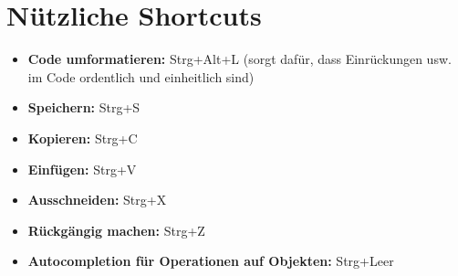 \section*{Nützliche Shortcuts}
\begin{itemize}
    \item \textbf{Code umformatieren:} Strg+Alt+L (sorgt dafür, dass Einrückungen usw. im Code ordentlich und einheitlich sind)
    \item \textbf{Speichern:} Strg+S
    \item \textbf{Kopieren:} Strg+C 
    \item \textbf{Einfügen:} Strg+V
    \item \textbf{Ausschneiden:} Strg+X
    \item \textbf{Rückgängig machen:} Strg+Z
    \item \textbf{Autocompletion für Operationen auf Objekten:} Strg+Leer
\end{itemize}